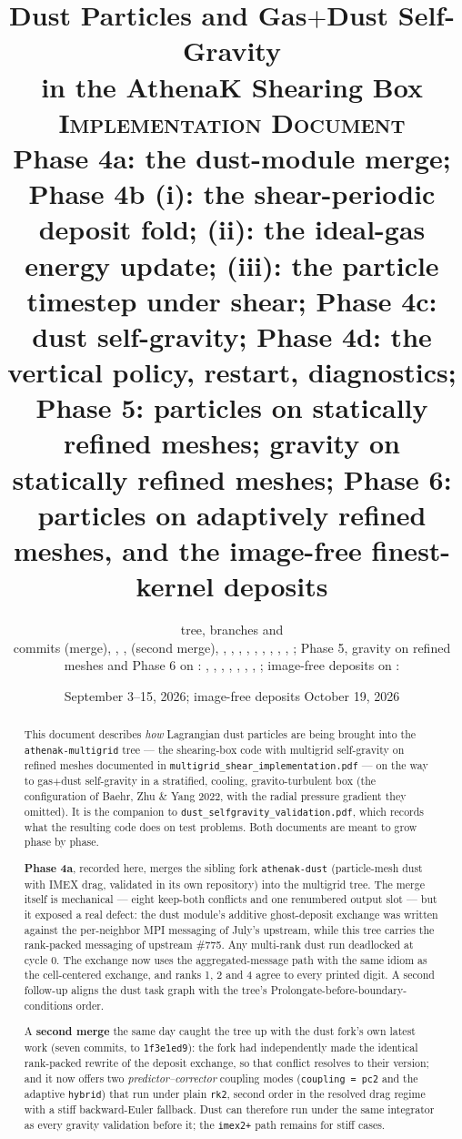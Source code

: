 \documentclass[11pt]{article}
\title{Dust Particles and Gas$+$Dust Self-Gravity\\
       in the AthenaK Shearing Box\\[0.4em]
       \large \textsc{Implementation Document}\\
       \large Phase 4a: the dust-module merge; Phase 4b (i): the shear-periodic
       deposit fold; (ii): the ideal-gas energy update; (iii): the particle
       timestep under shear; Phase 4c: dust self-gravity; Phase 4d: the vertical
       policy, restart, diagnostics; Phase 5: particles on statically refined meshes;
       gravity on statically refined meshes; Phase 6: particles on adaptively refined
       meshes, and the image-free finest-kernel deposits}
\author{\code{athenak-multigrid} tree, branches \code{dust-multigrid} and \code{dust-smr}\\
        \small commits \code{449b8f09} (merge), \code{a7c0def3}, \code{774c6519},
        \code{78320aee} (second merge), \code{6c0cafef}, \code{489c656c}, \code{375643e6},
        \code{9a96f9f3}, \code{d39858ac}, \code{a9279dc8},
        \code{386d5968}, \code{538fb43b}, \code{1506c83f}, \code{f54271ba}; Phase 5,
        gravity on refined meshes and Phase 6 on \code{dust-smr}:
        \code{04dbd3dd}, \code{af45c756}, \code{c3d7b308}, \code{1c2c0558}, \code{a2252182},
        \code{06994aa6}, \code{70fc3e82}, \code{424cd7e3}; image-free deposits on
        \code{si-strat-amr}: \code{1f811c1c}}
\date{September 3--15, 2026; image-free deposits October 19, 2026}
\newcommand{\code}[1]{\texttt{#1}}
\newcommand{\file}[1]{\texttt{\small #1}}
\begin{document}
\maketitle

\begin{abstract}
\noindent
This document describes \emph{how} Lagrangian dust particles are being brought into
the \code{athenak-multigrid} tree --- the shearing-box code with multigrid
self-gravity on refined meshes documented in
\file{multigrid\_shear\_implementation.pdf} --- on the way to gas$+$dust
self-gravity in a stratified, cooling, gravito-turbulent box (the configuration of
Baehr, Zhu \& Yang 2022, with the radial pressure gradient they omitted). It is the
companion to \file{dust\_selfgravity\_validation.pdf}, which records what the
resulting code does on test problems. Both documents are meant to grow phase by phase.

\textbf{Phase 4a}, recorded here, merges the sibling fork \code{athenak-dust}
(particle-mesh dust with IMEX drag, validated in its own repository) into the
multigrid tree. The merge itself is mechanical --- eight keep-both conflicts and one
renumbered output slot --- but it exposed a real defect: the dust module's additive
ghost-deposit exchange was written against the per-neighbor MPI messaging of
July's upstream, while this tree carries the rank-packed messaging of upstream
\#775. Any multi-rank dust run deadlocked at cycle 0. The exchange now uses the
aggregated-message path with the same idiom as the cell-centered exchange, and
ranks 1, 2 and 4 agree to every printed digit. A second follow-up aligns the dust
task graph with the tree's Prolongate-before-boundary-conditions order.

A \textbf{second merge} the same day caught the tree up with the dust fork's own
latest work (seven commits, to \code{1f3e1ed9}): the fork had independently made
the identical rank-packed rewrite of the deposit exchange, so that conflict resolves
to their version; and it now offers two \emph{predictor--corrector} coupling modes
(\code{coupling = pc2} and the adaptive \code{hybrid}) that run under plain
\code{rk2}, second order in the resolved drag regime with a stiff backward-Euler
fallback. Dust can therefore run under the same integrator as every gravity
validation before it; the \code{imex2+} path remains for stiff cases.


\end{abstract}
\end{document}
